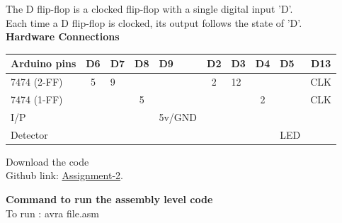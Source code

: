 \documentclass[10pt,a4paper]{report}
\begin{document}
\begin{multicols}{2}
The D flip-flop is a clocked flip-flop with a single digital input 'D'. \\ Each time a D flip-flop is clocked, its output follows the state of 'D'.\\
\vspace{1cm}
\textbf{Hardware Connections }
\begin{center}
\setlength{\arrayrulewidth}{0.5mm}
\setlength{\tabcolsep}{0.9pt}
\renewcommand{\arraystretch}{2}
    \begin{tabular}{|l|c|l|c|l|c|l|c|l|c|}
    \hline 
    \textbf{Arduino pins} & \textbf{D6} & \textbf{D7} & \textbf{D8} & \textbf{ D9} & \textbf{D2} & \textbf{D3} & \textbf{D4} & \textbf{D5}& \textbf{D13}\\
    \hline
    7474 (2-FF) & 5 & 9 &  &  & 2 & 12 &  &  & CLK \\  \hline
    7474 (1-FF) &  &  & 5 &  &  &  & 2 &  & CLK \\ \hline
    I/P &  &  &   & 5v/GND &  &  &   &    &   \\ \hline
    Detector&  &  &   &  &  &  &   & LED &  \\ 
    \hline
      \end{tabular}
  \end{center}
  
\raggedright  Download the code \\
Github link: \href{https://github.com/chiragshah1244/FWC/blob/main/assignments/assignment_2/code/seq.asm}{Assignment-2}.

\vspace{2mm}\textbf{Command to run the assembly level code }\\
To run : avra file.asm \\

  \end{multicols}
\end{document}

